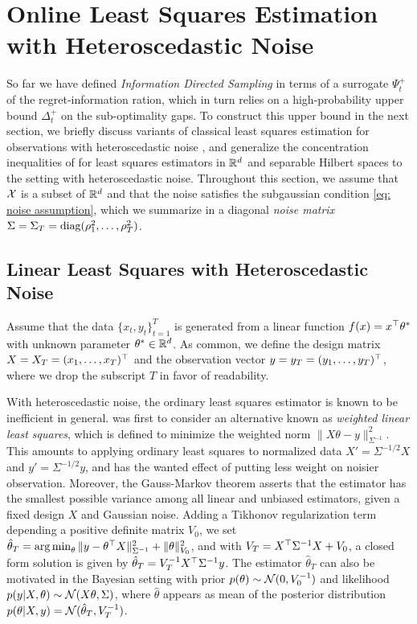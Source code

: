 \section{Online Least Squares Estimation with Heteroscedastic Noise}\label{section: least squares regregression with heteroscedastic noise}
So far we have defined \emph{Information Directed Sampling} in terms of a surrogate $\Psi_t^+$ of the regret-information ration, which in turn relies on a high-probability upper bound $\Delta_t^+$ on the sub-optimality gaps. To construct this upper bound in the next section, we briefly discuss variants of classical least squares estimation for observations with heteroscedastic noise \cite[see also][]{AitkenIVleastsquares1936, RasmussenGaussianprocessesmachine2006}, and generalize the concentration inequalities of \cite{Abbasi-YadkoriOnlinelearninglinearly2012} for least squares estimators in $\mathbb{R}^d$ and separable Hilbert spaces to the setting with heteroscedastic noise. Throughout this section, we assume that $\mathcal{X}$ is a subset of $\mathbb{R}^d$ and that the noise satisfies the subgaussian condition \eqref{eq: noise assumption}, which we summarize in a diagonal \emph{noise matrix} $\Sigma = \Sigma_T = \text{diag}(\rho_1^2, \dots, \rho_T^2)$.

\subsection{Linear Least Squares with Heteroscedastic Noise}
Assume that the data $\{x_t,y_t\}_{t=1}^T$ is generated from a linear function $f(x) = x^\top \theta^*$ with unknown parameter $\theta^* \in \mathbb{R}^d$. As common, we define the design matrix $X = X_T = (x_1,\dots, x_T)^\top$ and the observation vector $y = y_T = (y_1,\dots,y_T)^\top$, where we drop the subscript $T$ in favor of readability.

With heteroscedastic noise, the ordinary least squares estimator is known to be inefficient in general. \cite{AitkenIVleastsquares1936} was first to consider an alternative known as \emph{weighted linear least squares}, which is defined to minimize the weighted norm $\| X\theta - y \|_{\Sigma^{-1}}^2$. This amounts to applying ordinary least squares to normalized data $X' = \Sigma^{-1/2}X$ and $y' = \Sigma^{-1/2}y$, and has the wanted effect of putting less weight on noisier observation. Moreover, the Gauss-Markov theorem asserts that the estimator has the smallest possible variance among all linear and unbiased estimators, given a fixed design $X$ and Gaussian noise. Adding a Tikhonov regularization term depending a positive definite matrix $V_0$, we set $\hat{\theta}_T = \operatorname*{arg\,min}_{\theta} \|y - \theta^\top X\|_{\Sigma^{-1}}^2 + \|\theta\|_{V_0}^2$, and with $V_T = X^\top\Sigma^{-1}X + V_0$, a closed form solution is given by $\hat{\theta}_T =  V_T^{-1}X^\top\Sigma^{-1} y$. The estimator $\hat{\theta}_T$ can also be motivated in the Bayesian setting with prior $p(\theta) \sim \mathcal{N}(0, V_0^{-1})$ and likelihood $p(y|X,\theta) \sim \mathcal{N}(X\theta, \Sigma)$, where $\hat{\theta}$ appears as mean of the posterior distribution $p(\theta|X,y) = \mathcal{N}(\hat{\theta}_T, V_T^{-1})$.

